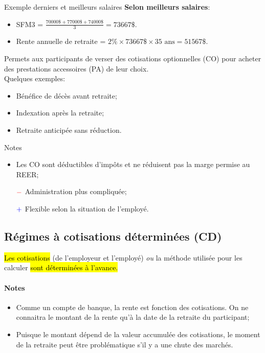 \documentclass[10pt, french]{article}
\begin{document}
\begin{multicols*}{3}
\begin{conceptgen}{Exemple derniers et meilleurs salaires}
\textbf{Selon meilleurs salaires}:
\begin{itemize}
	\item	SFM3 = $\frac{70 000\$ + 77 000\$ + 74 000\$}{3} = 73 667\$$.
	\item	Rente annuelle de retraite = $2\% \times 73 667\$ \times 35 \text{ ans} = 51 567\$$.
\end{itemize}
\end{conceptgen}

\begin{definitionNOHFILL}
Permets aux participants de verser des cotisations optionnelles (CO) pour acheter des prestations accessoires (PA) de leur choix.\\

Quelques exemples:
\begin{itemize}[leftmargin = *]
	\item	Bénéfice de décès avant retraite;
	\item	Indexation après la retraite;
	\item	Retraite anticipée sans réduction.
\end{itemize}

Notes
\begin{itemize}[leftmargin = *]
	\item	Les CO sont déductibles d'impôts et ne réduisent pas la marge permise au REER;
	\item[$\color{red}-$]	Administration plus compliquée;
	\item[$\color{blue}+$]	Flexible selon la situation de l'employé.
\end{itemize}
\end{definitionNOHFILL}

\columnbreak

\subsection*{Régimes à cotisations déterminées (CD)}

\begin{definitionNOHFILL}[Description]
\hl{Les cotisations} (de l'employeur et l'employé) \textit{ou} la méthode utilisée pour les calculer \hl{sont déterminées à l'avance.}

\paragraph{Notes}
\begin{itemize}[leftmargin = *]
	\item	Comme un compte de banque, la rente est fonction des cotisations. On ne connaitra le montant de la rente qu'à la date de la retraite du participant;
	\item	Puisque le montant dépend de la valeur accumulée des cotisations, le moment de la retraite peut être problématique s'il y a une chute des marchés.
\end{itemize}
\end{definitionNOHFILL}



\end{multicols*}
\end{document}
